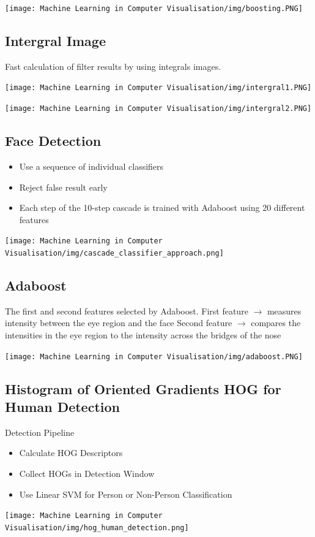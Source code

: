 \documentclass[x11names,11pt,a4paper]{article}
\theoremstyle{definition}
\begin{document}
\begin{center}
	\texttt{[image: Machine Learning in Computer Visualisation/img/boosting.PNG]}
\end{center}

\subsection{Intergral Image}
Fast calculation of filter results by using integrals images.
\begin{center}
	\texttt{[image: Machine Learning in Computer Visualisation/img/intergral1.PNG]}
\end{center}
\begin{center}
	\texttt{[image: Machine Learning in Computer Visualisation/img/intergral2.PNG]}
\end{center}

\subsection{Face Detection}
\begin{itemize}
    \item Use a sequence of individual classifiers
    \item Reject false result early
    \item Each step of the 10-step cascade is trained with Adaboost using 20 different features
\end{itemize}

\begin{center}
	\texttt{[image: Machine Learning in Computer Visualisation/img/cascade\_classifier\_approach.png]}
\end{center}

\subsection{Adaboost}
The first and second features selected by Adaboost.\newline
First feature $\rightarrow$ measures intensity between the eye region and the face
Second feature $\rightarrow$ compares the intensities in the eye region to the intensity across the bridges of the nose
\begin{center}
	\texttt{[image: Machine Learning in Computer Visualisation/img/adaboost.PNG]}
\end{center}

\subsection{Histogram of Oriented Gradients HOG for Human Detection}
Detection Pipeline
\begin{itemize}[label=-]
	\item Calculate HOG Descriptors
	\item Collect HOGs in Detection Window
	\item Use Linear SVM for Person or Non-Person Classification
\end{itemize}
\begin{center}
	\texttt{[image: Machine Learning in Computer Visualisation/img/hog\_human\_detection.png]}
\end{center}
\end{document}
